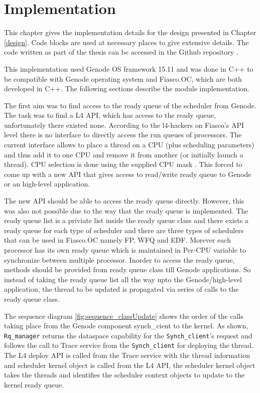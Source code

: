 \chapter{Implementation}

This chapter gives the implementation details for the design presented in Chapter \ref{design}. Code blocks are used at necessary places to give extensive details. The code written as part of the thesis can be accessed in the Github repository \cite{git_synccode}.

This implementation used Genode OS framework 15.11 and was done in C++ to be compatible with Genode operating system and Fiasco.OC, which are both developed in C++. The following sections describe the module implementation.

The first aim was to find access to the ready queue of the scheduler from Genode. The task was to find a L4 API, which has access to the ready queue, unfortunately there existed none. According to the l4-hackers on Fiasco's API level there is no interface to directly access the run queues of processors. The current interface allows to place a thread on a CPU (plus scheduling parameters) and thus add it to one CPU and remove it from another (or initially launch a thread). CPU selection is done using the supplied CPU mask \cite{l4hack}. This forced to come up with a new API that gives access to read/write ready queue to Genode or an high-level application.

The new API should be able to access the ready queue directly. However, this was also not possible due to the way that the ready queue is implemented. The ready queue list is a priviate list inside the ready queue class and there exists a ready queue for each type of scheduler and there are three types of schedulers that can be used in Fiasco.OC namely FP, WFQ and EDF. Morever each processor has its own ready queue which is maintained in Per-CPU variable to synchronize between multiple processor. Inorder to access the ready queue, methods should be provided from ready queue class till Genode applications. So instead of taking the ready queue list all the way upto the Genode/high-level application, the thread to be updated is propagated via series of calls to the ready queue class.

The sequence diagram \ref{fig:sequence_classUpdate} shows the order of the calls taking place from the Genode component synch\_cient to the kernel. As shown, \texttt{Rq\_manager} returns the dataspace capability for the \texttt{Synch\_client}'s request and follows the call to Trace service from the \texttt{Synch\_client} for deploying the thread. The L4 deploy API is called from the Trace service with the thread information and scheduler kernel object is called from the L4 API, the scheduler kernel object takes the threads and identifies the scheduler context objects to update to the kernel ready queue.

